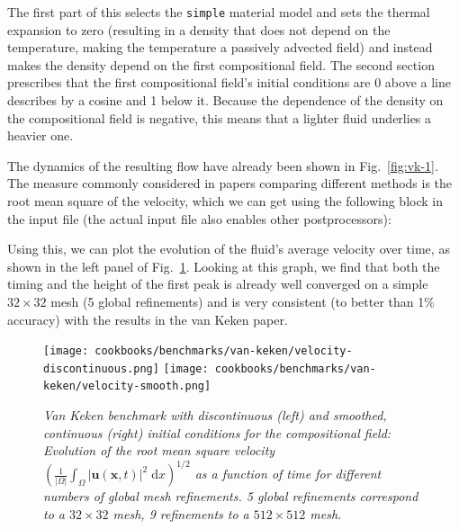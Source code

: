\documentclass{article}
\begin{document}


The first part of this selects the \texttt{simple} material model and sets the
thermal expansion to zero (resulting in a density that does not depend on the
temperature, making the temperature a passively advected field) and instead
makes the density depend on the first compositional field. The second section
prescribes that the first compositional field's
initial conditions are 0 above a line describes by a cosine and 1 below it.
Because the dependence of the density on the compositional field is negative,
this means that a lighter fluid underlies a heavier one.

The dynamics of the resulting flow have already been shown in
Fig.~\ref{fig:vk-1}. The measure commonly considered in papers comparing
different methods is the root mean square of the velocity, which we can get
using the following block in the input file (the actual input file also enables
other postprocessors):



Using this, we can plot the evolution of the fluid's average velocity over time,
as shown in the left panel of Fig.~\ref{fig:vk-2}. Looking at this graph, we
find that both the timing and the height of the first peak is already
well converged on a simple
$32\times 32$ mesh (5 global refinements) and is very consistent (to better
than 1\% accuracy) with the results in the van Keken paper.

\begin{figure}
  \texttt{[image: cookbooks/benchmarks/van-keken/velocity-discontinuous.png]}
  \hfill
  \texttt{[image: cookbooks/benchmarks/van-keken/velocity-smooth.png]}
  \caption{\it Van Keken benchmark with discontinuous (left) and smoothed,
  continuous (right) initial conditions for the compositional field:
  Evolution of the root mean square velocity $\left(\frac 1{|\Omega|}\int_\Omega |\mathbf u(\mathbf x,t)|^2 \;
  \text{d}x\right)^{1/2}$ as a function of time for different numbers of global mesh
  refinements. 5 global refinements correspond to a $32\times 32$ mesh, 9
  refinements to a $512\times 512$ mesh.}
  \label{fig:vk-2}
\end{figure}
\end{document}
